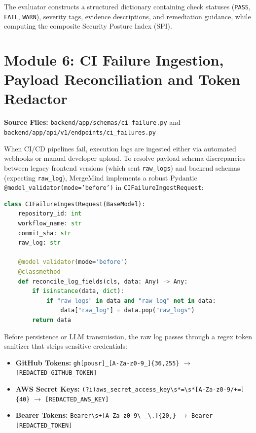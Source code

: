 The evaluator constructs a structured dictionary containing check statuses (\texttt{PASS}, \texttt{FAIL}, \texttt{WARN}), severity tags, evidence descriptions, and remediation guidance, while computing the composite Security Posture Index (SPI).

\section{Module 6: CI Failure Ingestion, Payload Reconciliation and Token Redactor}
\label{sec:impl-ci-failure}

\noindent\textbf{Source Files:} \texttt{backend/app/schemas/ci\_failure.py} and \texttt{backend/app/api/v1/endpoints/ci\_failures.py}

When CI/CD pipelines fail, execution logs are ingested either via automated webhooks or manual developer upload. To resolve payload schema discrepancies between legacy frontend versions (which sent \texttt{raw\_logs}) and backend schemas (expecting \texttt{raw\_log}), MergeMind implements a robust Pydantic \texttt{@model\_validator(mode='before')} in \texttt{CIFailureIngestRequest}:

\begin{lstlisting}[language=Python, caption={Pydantic Dual-Schema Payload Reconciliation Validator}]
class CIFailureIngestRequest(BaseModel):
    repository_id: int
    workflow_name: str
    commit_sha: str
    raw_log: str

    @model_validator(mode='before')
    @classmethod
    def reconcile_log_fields(cls, data: Any) -> Any:
        if isinstance(data, dict):
            if "raw_logs" in data and "raw_log" not in data:
                data["raw_log"] = data.pop("raw_logs")
        return data
\end{lstlisting}

Before persistence or LLM transmission, the raw log passes through a regex token sanitizer that strips sensitive credentials:
\begin{itemize}
    \item \textbf{GitHub Tokens:} \texttt{gh[pousr]\_[A-Za-z0-9\_]\{36,255\}} $\to$ \texttt{[REDACTED\_GITHUB\_TOKEN]}
    \item \textbf{AWS Secret Keys:} \texttt{(?i)aws\_secret\_access\_key\textbackslash s*=\textbackslash s*[A-Za-z0-9/+=]\{40\}} $\to$ \texttt{[REDACTED\_AWS\_KEY]}
    \item \textbf{Bearer Tokens:} \texttt{Bearer\textbackslash s+[A-Za-z0-9\textbackslash-\_\textbackslash.]\{20,\}} $\to$ \texttt{Bearer [REDACTED\_TOKEN]}
\end{itemize}

